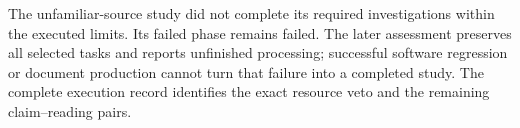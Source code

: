The unfamiliar-source study did not complete its required investigations within
the executed limits. Its failed phase remains failed. The later assessment
preserves all selected tasks and reports unfinished processing; successful
software regression or document production cannot turn that failure into a
completed study. The complete execution record identifies the exact resource
veto and the remaining claim--reading pairs.

